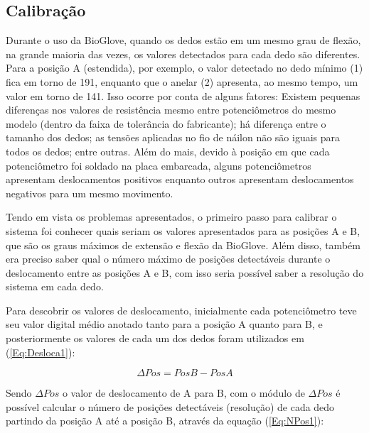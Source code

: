 \documentclass[
	12pt,				%
	openright,			%
	oneside,			%
	a4paper,			%
	english,			%
	brazil				%
	]{abntex2}
\begin{document}
				
		\subsection{Calibração}


		Durante o uso da BioGlove, quando os dedos estão em um mesmo grau de flexão, na grande maioria das vezes, os valores detectados para cada dedo são diferentes. Para a posição A (estendida), por exemplo, o valor detectado no dedo mínimo (1) fica em torno de 191, enquanto que o anelar (2) apresenta, ao mesmo tempo, um valor em torno de 141. Isso ocorre por conta de alguns fatores: Existem pequenas diferenças nos valores de resistência mesmo entre potenciômetros do mesmo modelo (dentro da faixa de tolerância do fabricante); há diferença entre o tamanho dos dedos; as tensões aplicadas no fio de náilon não são iguais para todos os dedos; entre outras. Além do mais, devido à posição em que cada potenciômetro foi soldado na placa embarcada, alguns potenciômetros apresentam deslocamentos positivos enquanto outros apresentam deslocamentos negativos para um mesmo movimento.
		

		Tendo em vista os problemas apresentados, o primeiro passo para calibrar o sistema foi conhecer quais seriam os valores apresentados para as posições A e B, que são os graus máximos de extensão e flexão da BioGlove. Além disso, também era preciso saber qual o número máximo de posições detectáveis durante o deslocamento entre as posições A e B, com isso seria possível saber a resolução do sistema em cada dedo.

		Para descobrir os valores de deslocamento, inicialmente cada potenciômetro teve seu valor digital médio anotado tanto para a posição A quanto para B, e posteriormente os valores de cada um dos dedos foram utilizados em (\ref{Eq:Desloca1}):

	\begin{equation}
			\Delta Pos 	= Pos B 	- 	Pos A
		\label{Eq:Desloca1}
	\end{equation}

		Sendo $\Delta Pos$ o valor de deslocamento de A para B, com o módulo de $\Delta Pos$ é possível calcular o número de posições detectáveis (resolução) de cada dedo partindo da posição A até a posição B, através da equação (\ref{Eq:NPos1}):
\end{document}
